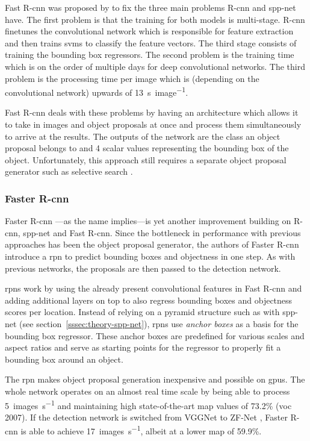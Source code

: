 \documentclass[final]{vutinfth} %
\begin{document}
Fast R-\gls{cnn} was proposed by \textcite{girshick2015a} to fix the
three main problems R-\gls{cnn} and \gls{spp}-net have. The first
problem is that the training for both models is
multi-stage. R-\gls{cnn} finetunes the convolutional network which is
responsible for feature extraction and then trains \glspl{svm} to
classify the feature vectors. The third stage consists of training the
bounding box regressors. The second problem is the training time which
is on the order of multiple days for deep convolutional networks. The
third problem is the processing time per image which is (depending on
the convolutional network) upwards of \qty{13}{\s\per image}.

Fast R-\gls{cnn} deals with these problems by having an architecture
which allows it to take in images and object proposals at once and
process them simultaneously to arrive at the results. The outputs of
the network are the class an object proposal belongs to and 4 scalar
values representing the bounding box of the object. Unfortunately,
this approach still requires a separate object proposal generator such
as selective search \cite{uijlings2013}.

\subsubsection{Faster R-\gls{cnn}}
\label{sssec:theory-faster-rcnn}

Faster R-\gls{cnn} \cite{ren2015,ren2017}—as the name implies—is yet
another improvement building on R-\gls{cnn}, \gls{spp}-net and Fast
R-\gls{cnn}. Since the bottleneck in performance with previous
approaches has been the object proposal generator, the authors of
Faster R-\gls{cnn} introduce a \gls{rpn} to predict bounding boxes and
objectness in one step. As with previous networks, the proposals are
then passed to the detection network.

\glspl{rpn} work by using the already present convolutional features
in Fast R-\gls{cnn} and adding additional layers on top to also
regress bounding boxes and objectness scores per location. Instead of
relying on a pyramid structure such as with \gls{spp}-net (see
section~\ref{sssec:theory-spp-net}), \glspl{rpn} use \emph{anchor
boxes} as a basis for the bounding box regressor. These anchor boxes
are predefined for various scales and aspect ratios and serve as
starting points for the regressor to properly fit a bounding box
around an object.

The \gls{rpn} makes object proposal generation inexpensive and
possible on \glspl{gpu}. The whole network operates on an almost real
time scale by being able to process \qty{5}{images\per\s} and
maintaining high state-of-the-art \gls{map} values of 73.2\%
(\gls{voc} 2007). If the detection network is switched from VGGNet
\cite{liu2015} to ZF-Net \cite{zeiler2014}, Faster R-\gls{cnn} is able
to achieve \qty{17}{images\per\s}, albeit at a lower \gls{map} of
59.9\%.
\end{document}

